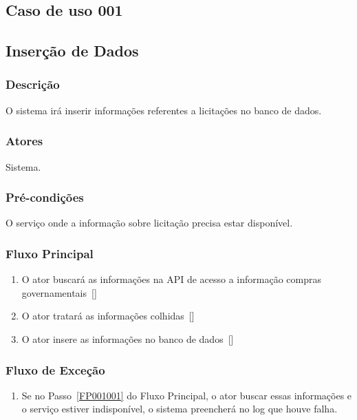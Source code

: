 \begin{anexosenv}

\partanexos

\chapter{Caso de uso 001}\label{CASO001}

\section*{Inserção de Dados}

\subsection*{Descrição}
O sistema irá inserir informações referentes a licitações no banco de dados.

\subsection*{Atores}
Sistema.

\subsection*{Pré-condições}
O serviço onde a informação sobre licitação precisa estar disponível.

\subsection*{Fluxo Principal}
\begin{enumerate}
    \item\label{FP001001} O ator buscará as informações na API de acesso a informação compras governamentais~[]
    \item O ator tratará as informações colhidas~[]
    \item O ator insere as informações no banco de dados~[]
\end{enumerate}

\subsection*{Fluxo de Exceção}
\begin{enumerate}
    \item Se no Passo~\ref{FP001001} do Fluxo Principal, o ator buscar essas informações e o serviço estiver indisponível, o sistema preencherá no log que houve falha.
\end{enumerate}


\end{anexosenv}
